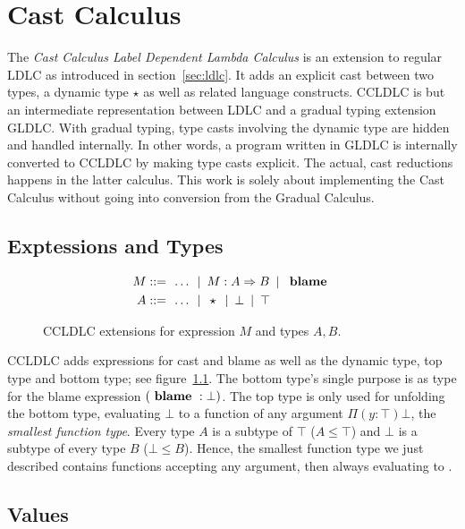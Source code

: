 \chapter{Cast Calculus}\label{chap:cast-calculus}

The \emph{Cast Calculus Label Dependent Lambda Calculus} is an extension to regular LDLC as introduced in section~\ref{sec:ldlc}. It adds an explicit cast between two types, a dynamic type $\star$ as well as related language constructs. CCLDLC is but an intermediate representation between LDLC and a gradual typing extension GLDLC. With gradual typing, type casts involving the dynamic type are hidden and handled internally. In other words, a program written in GLDLC is internally converted to CCLDLC by making type casts explicit. The actual, cast reductions happens in the latter calculus. This work is solely about implementing the Cast Calculus without going into conversion from the Gradual Calculus.

\section{Exptessions and Types}\label{sec:cc-expressions}

\begin{figure}
\begin{align*}
 M ::= & \enspace \dots \enspace|\enspace
     M : A \Rightarrow B \enspace|\enspace \text{ \textbf{blame} } \\
 A ::= & \enspace \dots \enspace|\enspace
     \star \enspace|\enspace \bot \enspace|\enspace \top
\end{align*}
\caption{CCLDLC  extensions for expression $M$ and types $A,  B$.}
\label{fig:ccldlc-extensions}
\end{figure}

CCLDLC adds expressions for cast and blame as well as the dynamic type, top type and bottom type; see figure~\ref{fig:ccldlc-extensions}.
The bottom type's single purpose is as type for the blame expression $(\text{ \textbf{blame} } : \bot)$. The top type is only used for unfolding the bottom type, evaluating $\bot$ to a function of any argument $\Pi(y:\top)\bot$, the \emph{smallest function type}. Every type $A$ is a subtype of $\top$ ($A \leq \top$) and $\bot$ is a subtype of every type $B$ ($\bot \leq B$). Hence, the smallest function type we just described contains functions accepting any argument, then always evaluating to \blame.

\section{Values}

